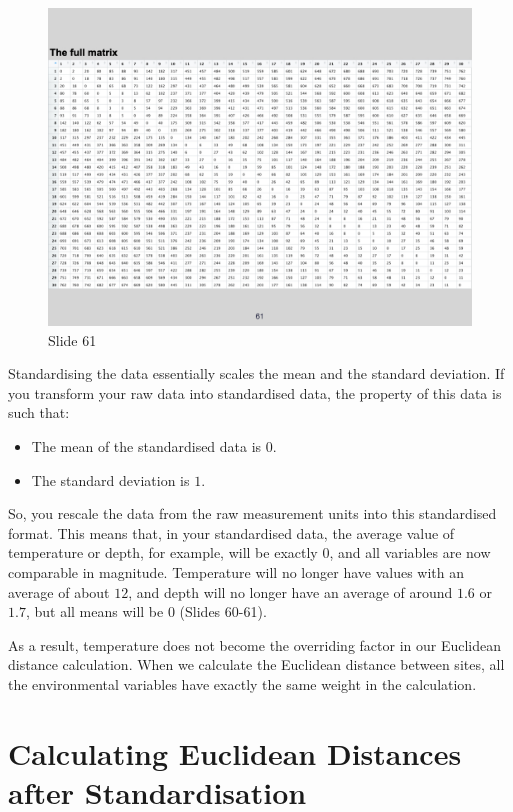 \documentclass[
  10pt,
]{book}
\providecommand{\tightlist}{%
  \setlength{\itemsep}{0pt}\setlength{\parskip}{0pt}}
\begin{document}
\begin{figure}[ht]
\centering
\includegraphics[width=0.8\linewidth]{../images/BDC334/BDC334-061.jpeg}
\caption*{Slide 61}
\end{figure}

Standardising the data essentially scales the mean and the standard
deviation. If you transform your raw data into standardised data, the
property of this data is such that:

\begin{itemize}
\tightlist
\item
  The mean of the standardised data is \(0\).
\item
  The standard deviation is \(1\).
\end{itemize}

So, you rescale the data from the raw measurement units into this
standardised format. This means that, in your standardised data, the
average value of temperature or depth, for example, will be exactly
\(0\), and all variables are now comparable in magnitude. Temperature
will no longer have values with an average of about \(12\), and depth
will no longer have an average of around \(1.6\) or \(1.7\), but all
means will be \(0\) (Slides 60-61).

As a result, temperature does not become the overriding factor in our
Euclidean distance calculation. When we calculate the Euclidean distance
between sites, all the environmental variables have exactly the same
weight in the calculation.

\section{Calculating Euclidean Distances after
Standardisation}\label{calculating-euclidean-distances-after-standardisation}
\end{document}
